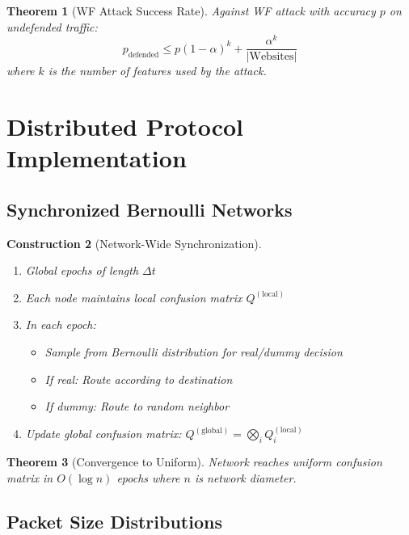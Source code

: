 \documentclass[11pt,final]{article}
\newtheorem{theorem}{Theorem}[section]
\newtheorem{construction}[theorem]{Construction}
\begin{document}
\begin{theorem}[WF Attack Success Rate]
Against WF attack with accuracy $p$ on undefended traffic:
\begin{equation}
p_{\text{defended}} \leq p(1-\alpha)^k + \frac{\alpha^k}{|\text{Websites}|}
\end{equation}
where $k$ is the number of features used by the attack.
\end{theorem}

\section{Distributed Protocol Implementation}

\subsection{Synchronized Bernoulli Networks}

\begin{construction}[Network-Wide Synchronization]
\begin{enumerate}
    \item Global epochs of length $\Delta t$
    \item Each node maintains local confusion matrix $Q^{(\text{local})}$
    \item In each epoch:
        \begin{itemize}
            \item Sample from Bernoulli distribution for real/dummy decision
            \item If real: Route according to destination
            \item If dummy: Route to random neighbor
        \end{itemize}
    \item Update global confusion matrix: $Q^{(\text{global})} = \bigotimes_i Q^{(\text{local})}_i$
\end{enumerate}
\end{construction}

\begin{theorem}[Convergence to Uniform]
Network reaches uniform confusion matrix in $O(\log n)$ epochs where $n$ is network diameter.
\end{theorem}

\subsection{Packet Size Distributions}
\end{document}
